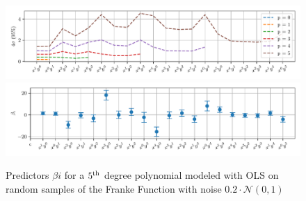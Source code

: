 \documentclass[reprint, english, nofootinbib]{revtex4-2}
\begin{document}

\begin{figure}
    \centering
    \includegraphics[width=2\columnwidth]{beta_confidence_interval_size_OLS.pdf}
    \includegraphics[width=2\columnwidth]{beta_confidence_interval_OLS.pdf}
    \caption{\label{fig:confidence intervals}Predictors $\beta{i}$ for a $5^{\textup{th}}$ degree polynomial modeled with OLS on random samples of the Franke Function with noise $0.2\cdot\mathcal{N}(0, 1)$}
\end{figure}
\end{document}
